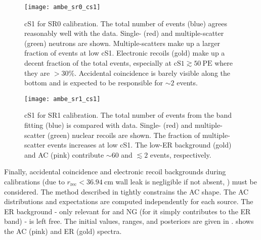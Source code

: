 \begin{figure}
\centering
\texttt{[image: ambe\_sr0\_cs1]}
\caption{cS1 for SR0 \ambe calibration.  The total number of events (blue) agrees reasonably well with the data.  Single- (red) and
multiple-scatter (green) neutrons are shown.  Multiple-scatters make up a larger fraction of events
at low cS1.  Electronic recoils (gold) make up a decent fraction of the total events, especially at $\mathrm{cS1} \gtrsim 50\ \mathrm{PE}$
where they are $> 30\%$.  Accidental coincidence is barely visible along the bottom and is expected to be responsible for ${\sim}2$
events.}
\label{fig:er_nr_calibrations_results_ambe_sr0_cs1}
\end{figure}

\begin{figure}
\centering
\texttt{[image: ambe\_sr1\_cs1]}
\caption{cS1 for SR1 \ambe calibration.  The total number of events from the band fitting (blue) is compared with data.  Single- (red)
and multiple-scatter (green) nuclear recoils are shown.  The fraction of multiple-scatter events increases at low cS1.  The low-ER
background (gold) and AC (pink) contribute ${\sim}60$ and $\lesssim 2$ events, respectively.}
\label{fig:er_nr_calibrations_results_ambe_sr1_cs1}
\end{figure}

Finally, accidental coincidence and electronic recoil backgrounds during calibrations (due to
$r_{\mathrm{rec}} < 36.94\ \mathrm{cm}$ wall leak is negligible if not absent,
) must be considered.  The method
described in  tightly constrains the AC shape.  The AC
distributions and expectations are computed independently for each source.  The ER background - only relevant for \ambe and NG
(for  it simply contributes to the ER band) - is left free.  The initial values, ranges, and posteriors are given in
.   shows the AC (pink) and ER
(gold) spectra.

